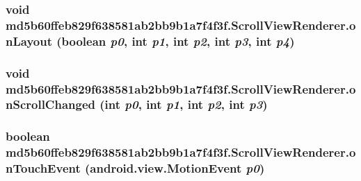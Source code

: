 \hypertarget{classmd5b60ffeb829f638581ab2bb9b1a7f4f3f_1_1_scroll_view_renderer_3d67ff8055c54f0f7e8b83c02e1f3e5b}{
\subsubsection[{onLayout}]{\setlength{\rightskip}{0pt plus 5cm}void md5b60ffeb829f638581ab2bb9b1a7f4f3f.ScrollViewRenderer.onLayout (boolean {\em p0}, \/  int {\em p1}, \/  int {\em p2}, \/  int {\em p3}, \/  int {\em p4})}}
\label{classmd5b60ffeb829f638581ab2bb9b1a7f4f3f_1_1_scroll_view_renderer_3d67ff8055c54f0f7e8b83c02e1f3e5b}


\hypertarget{classmd5b60ffeb829f638581ab2bb9b1a7f4f3f_1_1_scroll_view_renderer_75785a2000e6b0bdede6664ea1ab230c}{
\subsubsection[{onScrollChanged}]{\setlength{\rightskip}{0pt plus 5cm}void md5b60ffeb829f638581ab2bb9b1a7f4f3f.ScrollViewRenderer.onScrollChanged (int {\em p0}, \/  int {\em p1}, \/  int {\em p2}, \/  int {\em p3})}}
\label{classmd5b60ffeb829f638581ab2bb9b1a7f4f3f_1_1_scroll_view_renderer_75785a2000e6b0bdede6664ea1ab230c}


\hypertarget{classmd5b60ffeb829f638581ab2bb9b1a7f4f3f_1_1_scroll_view_renderer_4581815eede4c1676de1f11fc07cb9c4}{
\subsubsection[{onTouchEvent}]{\setlength{\rightskip}{0pt plus 5cm}boolean md5b60ffeb829f638581ab2bb9b1a7f4f3f.ScrollViewRenderer.onTouchEvent (android.view.MotionEvent {\em p0})}}
\label{classmd5b60ffeb829f638581ab2bb9b1a7f4f3f_1_1_scroll_view_renderer_4581815eede4c1676de1f11fc07cb9c4}




